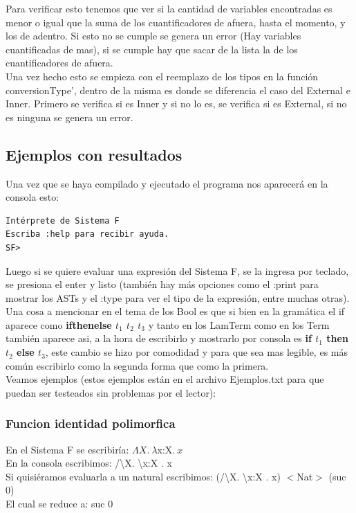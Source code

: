 \documentclass[12pt, titlepage, a4paper]{article}
\begin{document}
Para verificar esto tenemos que ver si la cantidad de variables encontradas es menor o igual que la suma de los cuantificadores de afuera, hasta el momento, y 
los de adentro. Si esto no se cumple se genera un error (Hay variables cuantificadas de mas), si se cumple hay que sacar de la lista la de los cuantificadores de afuera.\\

Una vez hecho esto se empieza con el reemplazo de los tipos en la función conversionType', dentro de la misma es donde se diferencia el caso del External e Inner. Primero 
se verifica si es Inner y si no lo es, se verifica si es External, si no es ninguna se genera un error.


\subsection{Ejemplos con resultados}
Una vez que se haya compilado y ejecutado el programa nos aparecerá en la consola esto:

\begin{verbatim}
Intérprete de Sistema F
Escriba :help para recibir ayuda.
SF>
\end{verbatim}

Luego si se quiere evaluar una expresión del Sistema F, se la ingresa por teclado, se presiona el enter y listo 
(también hay más opciones como el :print para mostrar los ASTs y el :type para ver el tipo de la expresión, entre muchas otras). \\

Una cosa a mencionar en el tema de los Bool es que si bien en la gramática el if aparece como \textbf{ifthenelse $t_1$ $t_2$ $t_3$} y 
tanto en los LamTerm como en los Term también aparece asi, a la hora de escribirlo y mostrarlo por consola es 
\textbf{if $t_1$ then $t_2$ else $t_3$}, este cambio se hizo por comodidad y para que sea mas legible, es más común escribirlo como la segunda forma que como 
la primera.\\

Veamos ejemplos (estos ejemplos están en el archivo Ejemplos.txt para que puedan ser testeados sin problemas por el lector):

\subsubsection{Funcion identidad polimorfica}
\noindent En el Sistema F se escribiría: $\Lambda X.\ \lambda $x:X$. \ x$ \\
En la consola escribimos: /\textbackslash X. \textbackslash x:X . x \\
Si quisiéramos evaluarla a un natural escribimos: (/\textbackslash X. \textbackslash x:X . x)  $<$Nat$>$ (suc 0) \\
El cual se reduce a: suc 0
\end{document}
